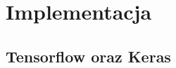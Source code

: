 \documentclass[a4paper,12pt]{book} %
\begin{document}
\chapter{Implementacja}
\section{Tensorflow oraz Keras}
\lipsum[1]\cite{doersch2021tutorial}

\listoftables{} %

\listoffigures{} %



\end{document}
